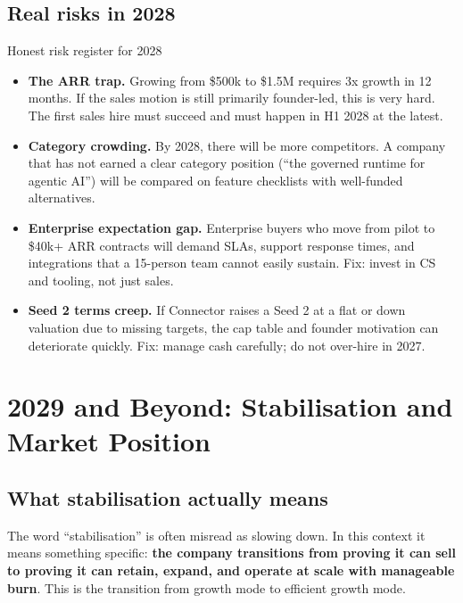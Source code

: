 \subsection{Real risks in 2028}

\begin{warnbox}{Honest risk register for 2028}
\begin{itemize}[noitemsep,leftmargin=1.4em]
  \item \textbf{The ARR trap.} Growing from \$500k to \$1.5M requires 3x
        growth in 12 months. If the sales motion is still primarily founder-led,
        this is very hard. The first sales hire must succeed and must happen
        in H1 2028 at the latest.
  \item \textbf{Category crowding.} By 2028, there will be more competitors.
        A company that has not earned a clear category position (``the governed
        runtime for agentic AI'') will be compared on feature checklists with
        well-funded alternatives.
  \item \textbf{Enterprise expectation gap.} Enterprise buyers who move from
        pilot to \$40k+ ARR contracts will demand SLAs, support response times,
        and integrations that a 15-person team cannot easily sustain. Fix:
        invest in CS and tooling, not just sales.
  \item \textbf{Seed 2 terms creep.} If Connector raises a Seed 2 at a flat or
        down valuation due to missing targets, the cap table and founder
        motivation can deteriorate quickly. Fix: manage cash carefully; do not
        over-hire in 2027.
\end{itemize}
\end{warnbox}

\section{2029 and Beyond: Stabilisation and Market Position}

\subsection{What stabilisation actually means}

The word ``stabilisation'' is often misread as slowing down. In this context it
means something specific: \textbf{the company transitions from proving it can
sell to proving it can retain, expand, and operate at scale with manageable
burn}. This is the transition from growth mode to efficient growth mode.

